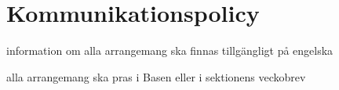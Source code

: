 \section{Kommunikationspolicy}
information om alla arrangemang ska finnas tillgängligt på engelska


alla arrangemang ska pras i Basen eller i sektionens veckobrev